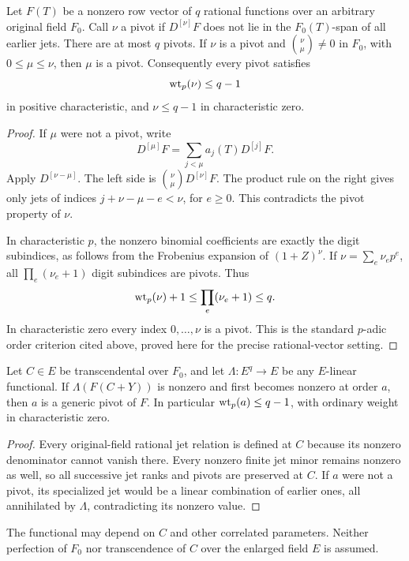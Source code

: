 \begin{lemma}\label{lem:pivots}
Let $F(T)$ be a nonzero row vector of $q$ rational functions over
an arbitrary original field $F_0$. Call $\nu$ a pivot if
$D^{[\nu]}F$ does not lie in the $F_0(T)$-span of all earlier jets.
There are at most $q$ pivots. If $\nu$ is a pivot and
$\binom\nu\mu\ne0$ in $F_0$, with $0\le\mu\le\nu$, then
$\mu$ is a pivot. Consequently every pivot satisfies
\[
 \operatorname{wt}_p(\nu)\le q-1
\]
in positive characteristic, and $\nu\le q-1$ in characteristic zero.
\end{lemma}
\begin{proof}
If $\mu$ were not a pivot, write
\[
 D^{[\mu]}F=\sum_{j<\mu}a_j(T)D^{[j]}F.
\]
Apply $D^{[\nu-\mu]}$. The left side is
$\binom\nu\mu D^{[\nu]}F$. The product rule on the right gives
only jets of indices $j+\nu-\mu-e<\nu$, for $e\ge0$.
This contradicts the pivot property of $\nu$.

In characteristic $p$, the nonzero binomial coefficients are exactly
the digit subindices, as follows from the Frobenius expansion of
$(1+Z)^\nu$. If $\nu=\sum_e\nu_ep^e$, all
$\prod_e(\nu_e+1)$ digit subindices are pivots. Thus
\[
 \operatorname{wt}_p(\nu)+1\le\prod_e(\nu_e+1)\le q.
\]
In characteristic zero every index $0,\ldots,\nu$ is a pivot.
This is the standard $p$-adic order criterion cited above, proved here
for the precise rational-vector setting.
\end{proof}

\begin{lemma}\label{lem:moving-functional}
Let $C\in E$ be transcendental over $F_0$, and let
$\Lambda:E^q\to E$ be any $E$-linear functional. If
$\Lambda(F(C+Y))$ is nonzero and first becomes nonzero at order $a$,
then $a$ is a generic pivot of $F$. In particular $\operatorname{wt}_p(a)\le q-1$,
with ordinary weight in characteristic zero.
\end{lemma}
\begin{proof}
Every original-field rational jet relation is defined at $C$ because
its nonzero denominator cannot vanish there. Every nonzero finite jet
minor remains nonzero as well, so all successive jet ranks and pivots
are preserved at $C$. If $a$ were not a pivot, its specialized jet
would be a linear combination of earlier ones, all annihilated by
$\Lambda$, contradicting its nonzero value.
\end{proof}

The functional may depend on $C$ and other correlated parameters.
Neither perfection of $F_0$ nor transcendence of $C$ over the enlarged
field $E$ is assumed.

